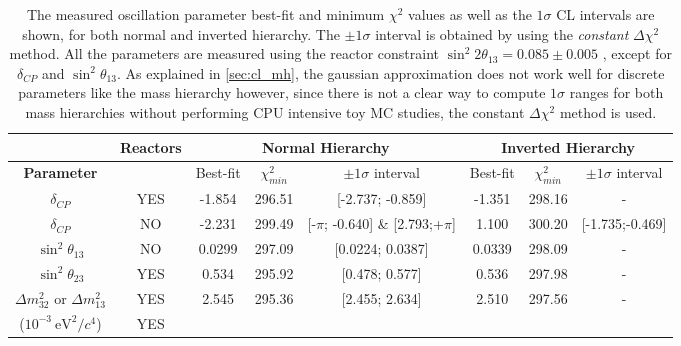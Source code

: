 \begin{table}[htb]
\centering
\begin{tabular}{| c | c | c | c | c || c | c | c | }
\hline
				& {\bf Reactors}		& \multicolumn{3}{c||}{\bf Normal Hierarchy} & \multicolumn{3}{c|}{\bf Inverted Hierarchy} \\
\hline										
\bf Parameter		&				& Best-fit	& $\chi^2_{min}$	& $\pm 1\sigma$ interval  	 	& Best-fit	& $\chi^2_{min}$ 	& $\pm 1\sigma$ interval  \\
\hline
$\delta_{CP}$             & YES      		& -1.854  	& 296.51			& [-2.737; -0.859]			& -1.351	& 298.16			& -	\\
$\delta_{CP}$            & NO        		& -2.231  	& 299.49			& [-$\pi$; -0.640]  \& [2.793;+$\pi$]	& 1.100	& 300.20			& [-1.735;-0.469]			\\
$\sin^2 \theta_{13}$    & NO             	& 0.0299  	& 297.09			& [0.0224; 0.0387]	        		& 0.0339	& 298.09			& -				\\
$\sin^2 \theta_{23}$                      & YES       	& 0.534	& 295.92			& [0.478; 0.577]			& 0.536	& 297.98			& -                 	\\
$\Delta m^2_{32}$ or $\Delta m^2_{13}$  & YES  & 2.545 	& 295.36 			& [2.455; 2.634]			& 2.510 	& 297.56			& -     	\\
($10^{-3} ~\text{eV}^2 / c^4$) 		& YES	& 		&				&						&		&				& \\
\hline
\end{tabular}
\caption{
The measured oscillation parameter best-fit
and minimum $\chi^2$ 
values  
as well as the 
$1\sigma$
CL intervals are shown,
for both normal and inverted hierarchy. 
The $\pm1\sigma$ interval is obtained by using the 
\emph{constant} $\Delta \chi^2$ method.
All the parameters are measured using the reactor constraint 
$\sin^2 2\theta_{13} = 0.085 \pm 0.005 $
\cite{pdg_2014},
except for $\delta_{CP}$ and $\sin^2 \theta_{13}$.
As explained in \cref{sec:cl_mh}, the gaussian approximation does not work well 
for discrete parameters like the mass hierarchy however, since there is not a clear way
to compute $1\sigma$ ranges for both mass hierarchies without performing
CPU intensive toy MC studies, the constant $\Delta \chi^2$ method is used.
}                                                                                                                                                                                          
\label{tab:joint_bestfit}
\end{table}





